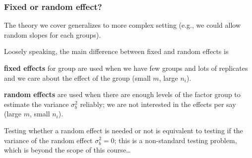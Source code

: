 \documentclass{beamer}
\begin{document}
\begin{frame}
 \frametitle{Fixed or random effect?}
 \bi \item The theory we cover generalizes to more complex setting (e.g., we could allow random slopes for each groups).
 \item Loosely speaking, the main difference between fixed and random effects is 
 \bi 
 \item \textbf{fixed effects} for group are used when we have few groups and lots of replicates and we care about the effect of the group (small $m$, large $n_i$).
 \item \textbf{random effects} are used when there are enough levels of the factor group to estimate the variance $\sigma^2_b$ reliably; we are not interested in the effects per say (large $m$, small $n_i$).
 \ei
 \item Testing whether a random effect is needed or not is equivalent to testing if the variance of the random effect $\sigma^2_b=0$; this is a non-standard testing problem, which is beyond the scope of this course\ldots 
 \ei
\end{frame}
\end{document}
